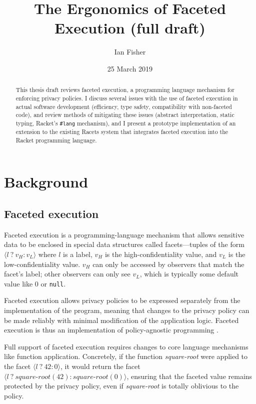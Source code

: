 \documentclass{article}
\title{The Ergonomics of Faceted Execution (full draft)}
\author{Ian Fisher}
\date{25 March 2019}
\begin{document}
\maketitle

\begin{abstract}
	This thesis draft reviews faceted execution, a programming language mechanism for enforcing privacy policies. I discuss several issues with the use of faceted execution in actual software development (efficiency, type safety, compatibility with non-faceted code), and review methods of mitigating these issues (abstract interpretation, static typing, Racket's \texttt{\#lang} mechanism), and I present a prototype implementation of an extension to the existing Racets system \cite{racets} that integrates faceted execution into the Racket programming language.
\end{abstract}

\tableofcontents

\section{Background}
\subsection{Faceted execution\label{sec:facets}}
Faceted execution is a programming-language mechanism that allows sensitive data to be enclosed in special data structures called facets---tuples of the form $\langle l\ ?\ v_H : v_L \rangle$ where $l$ is a label, $v_H$ is the high-confidentiality value, and $v_L$ is the low-confidentiality value. $v_H$ can only be accessed by observers that match the facet's label; other observers can only see $v_L$, which is typically some default value like $0$ or \texttt{null}.

Faceted execution allows privacy policies to be expressed separately from the implementation of the program, meaning that changes to the privacy policy can be made reliably with minimal modification of the application logic. Faceted execution is thus an implementation of policy-agnostic programming \cite{faceted}.

Full support of faceted execution requires changes to core language mechanisms like function application. Concretely, if the function \textit{square-root} were applied to the facet $\langle l \ ?\ 42 : 0 \rangle$, it would return the facet $\langle l \ ?\ \textit{square-root}(42) : \textit{square-root}(0) \rangle$, ensuring that the faceted value remains protected by the privacy policy, even if \textit{square-root} is totally oblivious to the policy.
\end{document}
